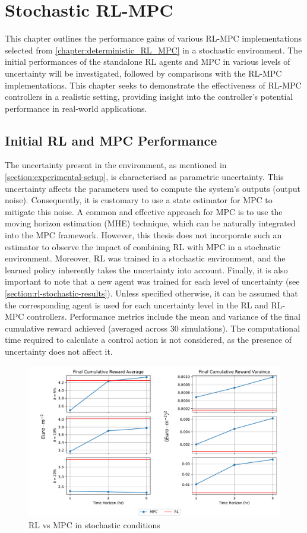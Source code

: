 \chapter{Stochastic RL-MPC}
\label{chapter:stochastic_RL_MPC}
This chapter outlines the performance gains of various RL-MPC implementations selected from \autoref{chapter:deterministic_RL_MPC} in a stochastic environment. The initial performances of the standalone RL agents and MPC in various levels of uncertainty will be investigated, followed by comparisons with the RL-MPC implementations. This chapter seeks to demonstrate the effectiveness of RL-MPC controllers in a realistic setting, providing insight into the controller’s potential performance in real-world applications.

\section{Initial RL and MPC Performance}
The uncertainty present in the environment, as mentioned in \autoref{section:experimental-setup}, is characterised as parametric uncertainty. This uncertainty affects the parameters used to compute the system’s outputs (output noise). Consequently, it is customary to use a state estimator for MPC to mitigate this noise. A common and effective approach for MPC is to use the moving horizon estimation (MHE) technique, which can be naturally integrated into the MPC framework. However, this thesis does not incorporate such an estimator to observe the impact of combining RL with MPC in a stochastic environment. Moreover, RL was trained in a stochastic environment, and the learned policy inherently takes the uncertainty into account. Finally, it is also important to note that a new agent was trained for each level of uncertainty (see \autoref{section:rl-stochastic-results}). Unless specified otherwise, it can be assumed that the corresponding agent is used for each uncertainty level in the RL and RL-MPC controllers. Performance metrics include the mean and variance of the final cumulative reward achieved (averaged across 30 simulations). The computational time required to calculate a control action is not considered, as the presence of uncertainty does not affect it.


\begin{figure}[H]
	\centering
	\includegraphics[width=\textwidth]{figures/stochastic_rl_vs_mpc.pdf}
	\caption{RL vs MPC in stochastic conditions}
	\label{fig:stochastic-rl-vs-mpc}
\end{figure}

